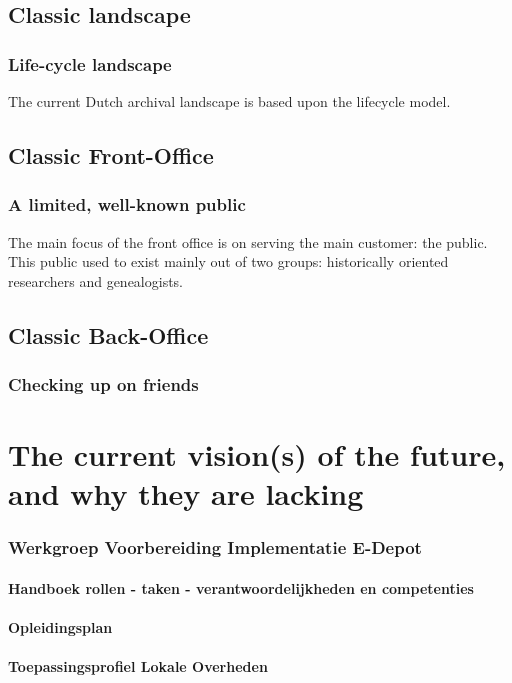 \documentclass[twoside,11pt]{Latex/Classes/PhDthesisPSnPDF}
\begin{document}
\section{Classic landscape}
\subsection{Life-cycle landscape}

The current Dutch archival landscape is based upon the lifecycle model. 

\section{Classic Front-Office} %
\subsection{A limited, well-known public}

The main focus of the front office is on serving the main customer: the public. This public used to exist mainly out of two groups: historically oriented researchers and genealogists.

\section{Classic Back-Office}
\subsection{Checking up on friends}

\chapter{The current vision(s) of the future, and why they are lacking}
\subsection{Werkgroep Voorbereiding Implementatie E-Depot}
\subsubsection{Handboek rollen - taken - verantwoordelijkheden en competenties}
\subsubsection{Opleidingsplan}
\subsubsection{Toepassingsprofiel Lokale Overheden}
\end{document}
